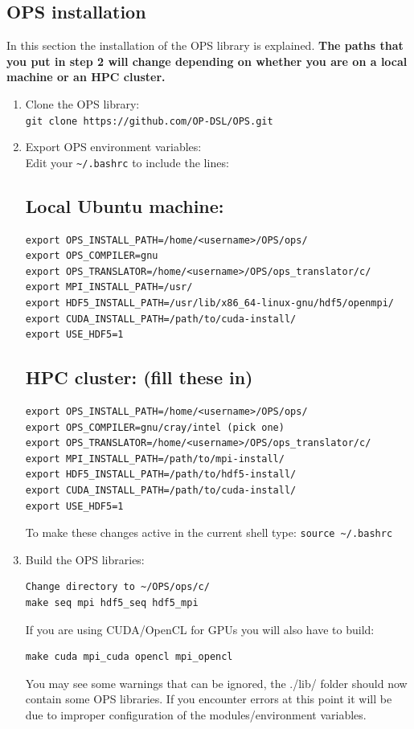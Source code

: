 \documentclass[11pt]{article}
\begin{document}
\subsection{OPS installation}\label{sec:OPS}
In this section the installation of the OPS library is explained. \textbf{The paths that you put in step 2 will change depending on whether you are on a local machine or an HPC cluster.}
\begin{enumerate}
\item{Clone the OPS library:\\ \verb|git clone https://github.com/OP-DSL/OPS.git|}
\item{Export OPS environment variables:\\ Edit your \verb|~/.bashrc| to include the lines:}
\subsection*{Local Ubuntu machine:}
\begin{verbatim}
export OPS_INSTALL_PATH=/home/<username>/OPS/ops/
export OPS_COMPILER=gnu
export OPS_TRANSLATOR=/home/<username>/OPS/ops_translator/c/
export MPI_INSTALL_PATH=/usr/
export HDF5_INSTALL_PATH=/usr/lib/x86_64-linux-gnu/hdf5/openmpi/
export CUDA_INSTALL_PATH=/path/to/cuda-install/
export USE_HDF5=1
\end{verbatim}

\subsection*{HPC cluster: (fill these in)}
\begin{verbatim}
export OPS_INSTALL_PATH=/home/<username>/OPS/ops/
export OPS_COMPILER=gnu/cray/intel (pick one)
export OPS_TRANSLATOR=/home/<username>/OPS/ops_translator/c/
export MPI_INSTALL_PATH=/path/to/mpi-install/
export HDF5_INSTALL_PATH=/path/to/hdf5-install/
export CUDA_INSTALL_PATH=/path/to/cuda-install/
export USE_HDF5=1
\end{verbatim}
To make these changes active in the current shell type: \verb|source ~/.bashrc|
\item{Build the OPS libraries:}
\begin{verbatim}
Change directory to ~/OPS/ops/c/
make seq mpi hdf5_seq hdf5_mpi
\end{verbatim}
If you are using CUDA/OpenCL for GPUs you will also have to build:
\begin{verbatim}
make cuda mpi_cuda opencl mpi_opencl
\end{verbatim}
You may see some warnings that can be ignored, the ./lib/ folder should now contain some OPS libraries. If you encounter errors at this point it will be due to improper configuration of the modules/environment variables.
\end{enumerate}
\end{document}
